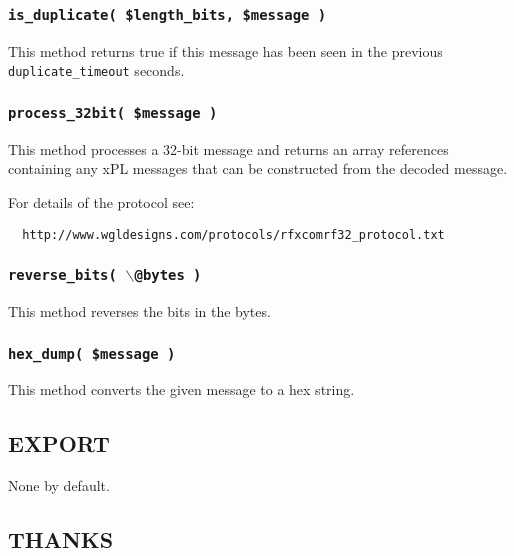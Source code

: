 \subsubsection*{\texttt{is\_duplicate( \$length\_bits, \$message )}\label{xPL::RF_is_duplicate_length_bits_message_}}


This method returns true if this message has been seen in the
previous \texttt{duplicate\_timeout} seconds.

\subsubsection*{\texttt{process\_32bit( \$message )}\label{xPL::RF_process_32bit_message_}}


This method processes a 32-bit message and returns an array references
containing any xPL messages that can be constructed from the decoded
message.



For details of the protocol see:

\begin{verbatim}
  http://www.wgldesigns.com/protocols/rfxcomrf32_protocol.txt
\end{verbatim}
\subsubsection*{\texttt{reverse\_bits( $\backslash$@bytes )}\label{xPL::RF_reverse_bits_backslash_bytes_}}


This method reverses the bits in the bytes.

\subsubsection*{\texttt{hex\_dump( \$message )}\label{xPL::RF_hex_dump_message_}}


This method converts the given message to a hex string.

\subsection*{EXPORT\label{xPL::RF_EXPORT}}


None by default.

\subsection*{THANKS\label{xPL::RF_THANKS}}


